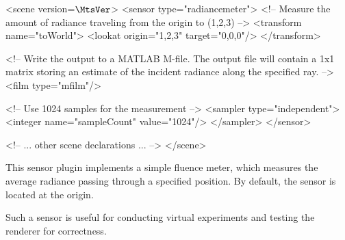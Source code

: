 \vspace{4mm}
\begin{xml}
<scene version=$\MtsVer$>
    <sensor type="radiancemeter">
        <!-- Measure the amount of radiance traveling
             from the origin to (1,2,3) -->
        <transform name="toWorld">
            <lookat origin="1,2,3"
                    target="0,0,0"/>
        </transform>

        <!-- Write the output to a MATLAB M-file. The output file will
             contain a 1x1 matrix storing an estimate of the incident
             radiance along the specified ray. -->
        <film type="mfilm"/>

        <!-- Use 1024 samples for the measurement -->
        <sampler type="independent">
            <integer name="sampleCount" value="1024"/>
        </sampler>
    </sensor>

    <!-- ... other scene declarations ... -->
</scene>
\end{xml}

This sensor plugin implements a simple fluence meter, which measures
the average radiance passing through a specified position.
By default, the sensor is located at the origin.

Such a sensor is useful for conducting virtual experiments and
testing the renderer for correctness.

